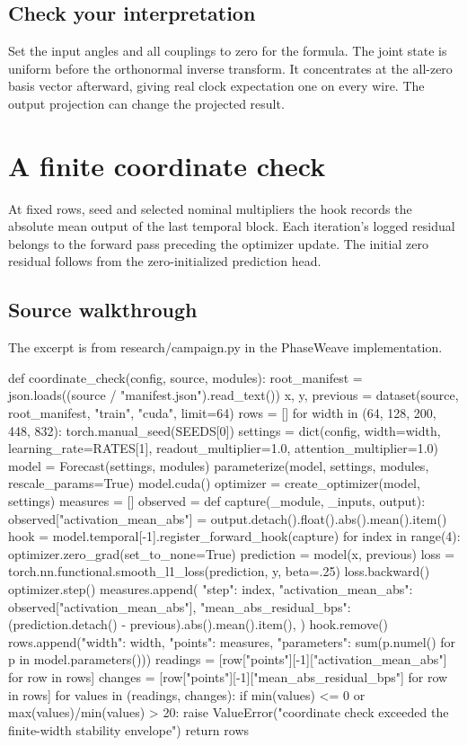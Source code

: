 \documentclass[11pt,oneside,openany]{book}
\begin{document}
\section*{Check your interpretation}
Set the input angles and all couplings to zero for the formula. The joint state is uniform before the orthonormal inverse transform. It concentrates at the all-zero basis vector afterward, giving real clock expectation one on every wire. The output projection can change the projected result.

\chapter{A finite coordinate check}
At fixed rows, seed and selected nominal multipliers the hook records the absolute mean output of the last temporal block. Each iteration's logged residual belongs to the forward pass preceding the optimizer update. The initial zero residual follows from the zero-initialized prediction head.

\section*{Source walkthrough}
The excerpt is from research/campaign.py in the PhaseWeave implementation.

\begin{BookCode}
def coordinate_check(config, source, modules):
    root_manifest = json.loads((source / "manifest.json").read_text())
    x, y, previous = dataset(source, root_manifest, "train", "cuda", limit=64)
    rows = []
    for width in (64, 128, 200, 448, 832):
        torch.manual_seed(SEEDS[0])
        settings = dict(config, width=width, learning_rate=RATES[1],
                        readout_multiplier=1.0, attention_multiplier=1.0)
        model = Forecast(settings, modules)
        parameterize(model, settings, modules, rescale_params=True)
        model.cuda()
        optimizer = create_optimizer(model, settings)
        measures = []
        observed = {}
        def capture(_module, _inputs, output):
            observed["activation_mean_abs"] = output.detach().float().abs().mean().item()
        hook = model.temporal[-1].register_forward_hook(capture)
        for index in range(4):
            optimizer.zero_grad(set_to_none=True)
            prediction = model(x, previous)
            loss = torch.nn.functional.smooth_l1_loss(prediction, y, beta=.25)
            loss.backward()
            optimizer.step()
            measures.append({
                "step": index, "activation_mean_abs": observed["activation_mean_abs"],
                "mean_abs_residual_bps": (prediction.detach() - previous).abs().mean().item(),
            })
        hook.remove()
        rows.append({"width": width, "points": measures,
                     "parameters": sum(p.numel() for p in model.parameters())})
    readings = [row["points"][-1]["activation_mean_abs"] for row in rows]
    changes = [row["points"][-1]["mean_abs_residual_bps"] for row in rows]
    for values in (readings, changes):
        if min(values) <= 0 or max(values)/min(values) > 20:
            raise ValueError("coordinate check exceeded the finite-width stability envelope")
    return rows
\end{BookCode}
\end{document}

